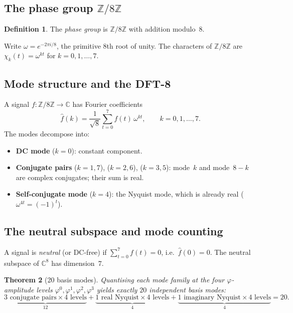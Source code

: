 \documentclass[11pt,a4paper]{article}
\theoremstyle{plain}
\newtheorem{theorem}{Theorem}[section]
\theoremstyle{definition}
\newtheorem{definition}[theorem]{Definition}
\theoremstyle{remark}
\newcommand{\phig}{\varphi}
\newcommand{\ZZ}{\mathbb{Z}}
\newcommand{\CC}{\mathbb{C}}
\begin{document}
\subsection{The phase group $\ZZ/8\ZZ$}

\begin{definition}\label{def:phase}
The \emph{phase group} is $\ZZ/8\ZZ$ with addition modulo~$8$.
\end{definition}

Write $\omega=e^{-2\pi i/8}$, the primitive 8th root of unity.
The characters of $\ZZ/8\ZZ$ are $\chi_k(t)=\omega^{kt}$ for
$k=0,1,\ldots,7$.

\subsection{Mode structure and the DFT-8}\label{ssec:dft8}

A signal $f:\ZZ/8\ZZ\to\CC$ has Fourier coefficients
\begin{equation}\label{eq:dft8}
  \hat f(k)=\frac{1}{\sqrt8}\sum_{t=0}^{7}f(t)\,\omega^{kt},
  \qquad k=0,1,\ldots,7.
\end{equation}
The modes decompose into:
\begin{itemize}[nosep]
\item \textbf{DC mode} ($k=0$): constant component.
\item \textbf{Conjugate pairs} ($k=1,7$), ($k=2,6$), ($k=3,5$):
  mode~$k$ and mode~$8{-}k$ are complex conjugates; their sum is
  real.
\item \textbf{Self-conjugate mode} ($k=4$): the Nyquist mode, which
  is already real ($\omega^{4t}=(-1)^t$).
\end{itemize}

\subsection{The neutral subspace and mode counting}

A signal is \emph{neutral} (or DC-free) if
$\sum_{t=0}^7 f(t)=0$, i.e.\ $\hat f(0)=0$.  The neutral
subspace of $\CC^8$ has dimension~$7$.

\begin{theorem}[20 basis modes]\label{thm:20modes}
Quantising each mode family at the four $\phig$-amplitude levels
$\phig^0,\phig^1,\phig^2,\phig^3$ yields exactly $20$ independent
basis modes:
\[
  \underbrace{3\text{ conjugate pairs}\times4\text{ levels}}_{12}
  +\underbrace{1\text{ real Nyquist}\times4\text{ levels}}_{4}
  +\underbrace{1\text{ imaginary Nyquist}\times4\text{ levels}}_{4}
  =20.
\]
\end{theorem}
\end{document}
